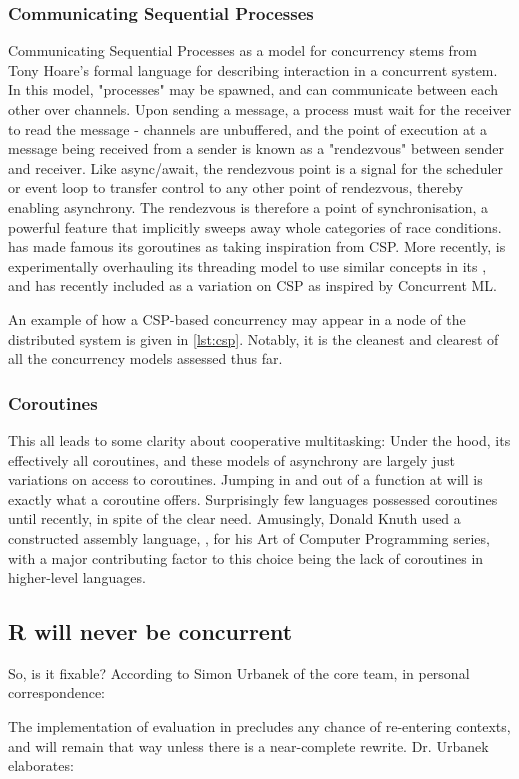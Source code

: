 \subsubsection{Communicating Sequential Processes}

Communicating Sequential Processes as a model for concurrency stems from Tony Hoare's formal language for describing interaction in a concurrent system\cite{hoare1978communicating}.
In this model, "processes" may be spawned, and can communicate between each other over channels.
Upon sending a message, a process must wait for the receiver to read the message - channels are unbuffered, and the point of execution at a message being received from a sender is known as a "rendezvous" between sender and receiver.
Like async/await, the rendezvous point is a signal for the scheduler or event loop to transfer control to any other point of rendezvous, thereby enabling asynchrony.
The rendezvous is therefore a point of synchronisation, a powerful feature that implicitly sweeps away whole categories of race conditions.
 has made famous its goroutines as taking inspiration from CSP\cite{gomem2014}.
More recently,  is experimentally overhauling its threading model to use similar concepts in its , and  has recently included  as a variation on CSP as inspired by Concurrent ML.

An example of how a CSP-based concurrency may appear in a node of the distributed system is given in \cref{lst:csp}.
Notably, it is the cleanest and clearest of all the concurrency models assessed thus far.


\subsubsection{Coroutines}

This all leads to some clarity about cooperative multitasking: Under the hood, its effectively all coroutines, and these models of asynchrony are largely just variations on access to coroutines.
Jumping in and out of a function at will is exactly what a coroutine offers.
Surprisingly few languages possessed coroutines until recently, in spite of the clear need.
Amusingly, Donald Knuth used a constructed assembly language, , for his Art of Computer Programming series, with a major contributing factor to this choice being the lack of coroutines in higher-level languages\cite{knuth1}.

\subsection{R will never be concurrent}\label{sec:no}

So, is it fixable?
According to Simon Urbanek of the \R{} core team, in personal correspondence:


The implementation of evaluation in \R{} precludes any chance of re-entering contexts, and will remain that way unless there is a near-complete rewrite. Dr. Urbanek elaborates:

